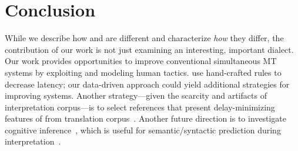 \section{Conclusion}
\label{sec:conclusion}

While we describe how \trans{} and \inter{} are different and
characterize \emph{how} they differ, the contribution of our work is
not just examining an interesting, important dialect.  Our work
provides opportunities to improve conventional simultaneous MT systems
by exploiting and modeling human tactics.   use
hand-crafted rules to decrease latency; our data-driven approach could
yield additional strategies for improving  systems.  Another
strategy---given the scarcity and artifacts of interpretation
corpus---is to select references that present delay-minimizing
features of \inter{} from translation
corpus~\cite{axelrod11selection}.  Another future direction is to
investigate cognitive inference~\cite{inference-in-interpretation},
which is useful for semantic/syntactic prediction during
interpretation~\cite{grissom14simtrans,oda15acl}.
